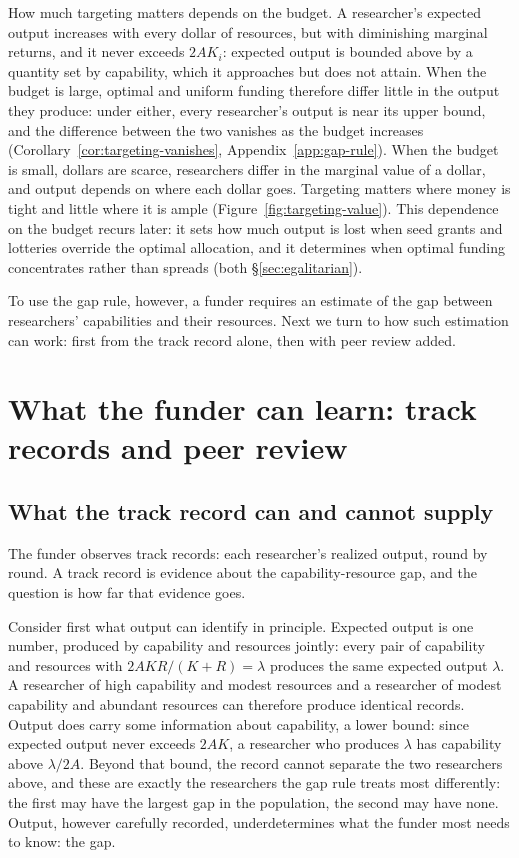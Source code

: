 \documentclass[article, 11pt, reqno]{amsart}
\theoremstyle{named}
\begin{document}
How much targeting matters depends on the budget. A researcher's expected output increases with every dollar of resources, but with diminishing marginal returns, and it never exceeds $2AK_i$: expected output is bounded above by a quantity set by capability, which it approaches but does not attain. When the budget is large, optimal and uniform funding therefore differ little in the output they produce: under either, every researcher's output is near its upper bound, and the difference between the two vanishes as the budget increases (Corollary~\ref{cor:targeting-vanishes}, Appendix~\ref{app:gap-rule}). When the budget is small, dollars are scarce, researchers differ in the marginal value of a dollar, and output depends on where each dollar goes. Targeting matters where money is tight and little where it is ample (Figure~\ref{fig:targeting-value}). This dependence on the budget recurs later: it sets how much output is lost when seed grants and lotteries override the optimal allocation, and it determines when optimal funding concentrates rather than spreads (both \S\ref{sec:egalitarian}).



To use the gap rule, however, a funder requires an estimate of the gap between researchers' capabilities and their resources. Next we turn to how such estimation can work: first from the track record alone, then with peer review added.

\section{What the funder can learn: track records and peer review}\label{sec:review}

\subsection*{What the track record can and cannot supply}\label{sec:records}

The funder observes track records: each researcher's realized output, round by round. A track record is evidence about the capability-resource gap, and the question is how far that evidence goes.

Consider first what output can identify in principle. Expected output is one number, produced by capability and resources jointly: every pair of capability and resources with $2AKR/(K+R) = \lambda$ produces the same expected output $\lambda$. A researcher of high capability and modest resources and a researcher of modest capability and abundant resources can therefore produce identical records. Output does carry some information about capability, a lower bound: since expected output never exceeds $2AK$, a researcher who produces $\lambda$ has capability above $\lambda/2A$. Beyond that bound, the record cannot separate the two researchers above, and these are exactly the researchers the gap rule treats most differently: the first may have the largest gap in the population, the second may have none. Output, however carefully recorded, underdetermines what the funder most needs to know: the gap.
\end{document}
